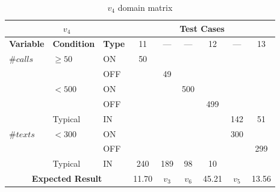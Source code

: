 %
  {\protect\numberline{}}
\begin{table}[!htbp]
  \centering
  \begin{tabular}{|*{3}{l|}*{6}{c|}}
    \hline
    \multicolumn{3}{|c|}{$v_4$}
    & \multicolumn{6}{|c|}{\textbf{Test Cases}} \\ \hline
    \textbf{Variable} & \textbf{Condition} & \textbf{Type}
                               &  11   &  ---  &  ---  &  12   &  ---  &  13   \\ \hline
    $\#calls$ & $\ge 50$ & ON  &  50   &       &       &       &       &       \\ \cline{3-9}
              &          & OFF &       &  49   &       &       &       &       \\ \cline{2-9}
              & $< 500$  & ON  &       &       &  500  &       &       &       \\ \cline{3-9}
              &          & OFF &       &       &       &  499  &       &       \\ \cline{2-9}
              & Typical  & IN  &       &       &       &       &  142  &  51   \\ \hline
    $\#texts$ & $< 300$  & ON  &       &       &       &       &  300  &       \\ \cline{3-9}
              &          & OFF &       &       &       &       &       &  299  \\ \cline{2-9}
              & Typical  & IN  &  240  &  189  &  98   &  10   &       &       \\ \hline
    \multicolumn{3}{|c|}{\textbf{Expected Result}}
                               & 11.70 & $v_3$ & $v_6$ & 45.21 & $v_5$ & 13.56 \\ \hline
  \end{tabular}
  \caption{$v_4$ domain matrix}
  \label{tab:methods.computeBill.matrices.v4}
\end{table}

